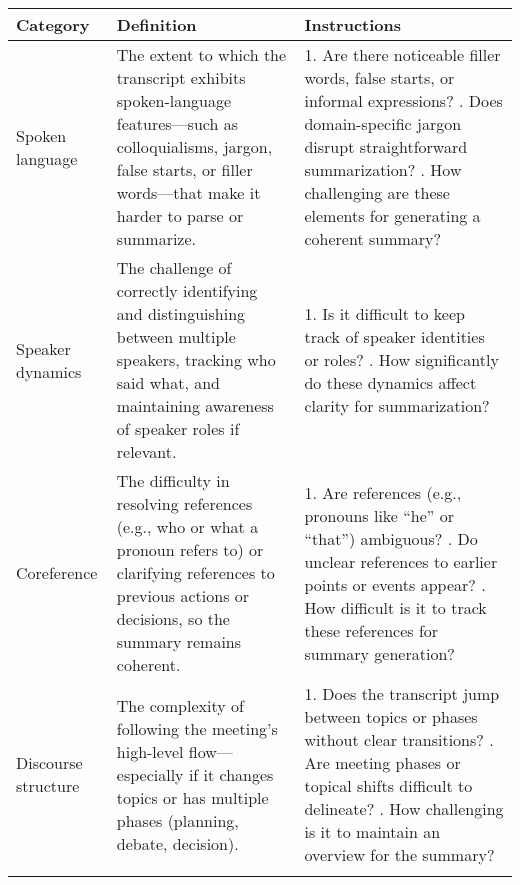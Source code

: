 \begin{table*}[ht]
  \centering
  \footnotesize
  \begin{tabularx}{\textwidth}{@{} l Y Y @{}}
    \toprule
    \textbf{Category} & \textbf{Definition} & \textbf{Instructions} \\
    \midrule
    Spoken language &
    The extent to which the transcript exhibits spoken-language features---such as colloquialisms, jargon, false starts, or filler words---that make it harder to parse or summarize. &
    1. Are there noticeable filler words, false starts, or informal expressions? . Does domain-specific jargon disrupt straightforward summarization? . How challenging are these elements for generating a coherent summary? \\
    \addlinespace

    Speaker dynamics &
    The challenge of correctly identifying and distinguishing between multiple speakers, tracking who said what, and maintaining awareness of speaker roles if relevant. &
    1. Is it difficult to keep track of speaker identities or roles? . How significantly do these dynamics affect clarity for summarization? \\
    \addlinespace

    Coreference &
    The difficulty in resolving references (e.g., who or what a pronoun refers to) or clarifying references to previous actions or decisions, so the summary remains coherent. &
    1. Are references (e.g., pronouns like “he” or “that”) ambiguous? . Do unclear references to earlier points or events appear? . How difficult is it to track these references for summary generation? \\
    \addlinespace

    Discourse structure &
    The complexity of following the meeting’s high-level flow---especially if it changes topics or has multiple phases (planning, debate, decision). &
    1. Does the transcript jump between topics or phases without clear transitions? . Are meeting phases or topical shifts difficult to delineate? . How challenging is it to maintain an overview for the summary? \\
    \addlinespace


\end{tabularx}
\end{table*}
